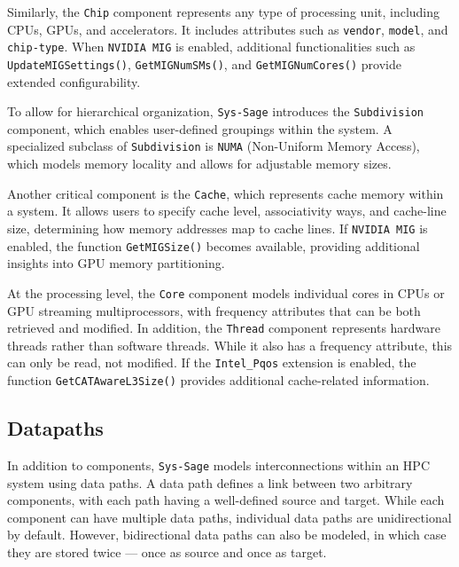 Similarly, the \texttt{Chip} component represents any type of processing unit, including CPUs, GPUs, and accelerators. It includes attributes such as \texttt{vendor}, \texttt{model}, and \texttt{chip-type}. When \texttt{NVIDIA MIG} is enabled, additional functionalities such as \texttt{UpdateMIGSettings()}, \texttt{GetMIGNumSMs()}, and \texttt{GetMIGNumCores()} provide extended configurability. \cite[see Chip]{sys-sage-docu}

To allow for hierarchical organization, \texttt{Sys-Sage} introduces the \texttt{Subdivision} component, which enables user-defined groupings within the system. A specialized subclass of \texttt{Subdivision} is \texttt{NUMA} (Non-Uniform Memory Access), which models memory locality and allows for adjustable memory sizes. \cite[see Subdivision, NUMA]{sys-sage-docu}  

Another critical component is the \texttt{Cache}, which represents cache memory within a system. It allows users to specify cache level, associativity ways, and cache-line size, determining how memory addresses map to cache lines. If \texttt{NVIDIA MIG} is enabled, the function \texttt{GetMIGSize()} becomes available, providing additional insights into GPU memory partitioning. \cite[see Cache]{sys-sage-docu}

At the processing level, the \texttt{Core} component models individual cores in CPUs or GPU streaming multiprocessors, with frequency attributes that can be both retrieved and modified. In addition, the \texttt{Thread} component represents hardware threads rather than software threads. While it also has a frequency attribute, this can only be read, not modified. If the \texttt{Intel\_Pqos} extension is enabled, the function \texttt{GetCATAwareL3Size()} provides additional cache-related information. \cite[see Core, Thread]{sys-sage-docu}

\subsection{Datapaths}

In addition to components, \texttt{Sys-Sage} models interconnections within an \ac{HPC} system using data paths. A data path defines a link between two arbitrary components, with each path having a well-defined source and target. While each component can have multiple data paths, individual data paths are unidirectional by default. However, bidirectional data paths can also be modeled, in which case they are stored twice — once as source and once as target. \cite[see Data Path]{sys-sage-docu}

